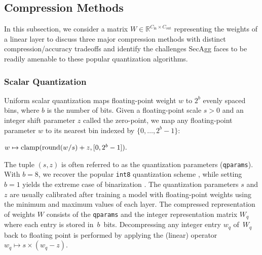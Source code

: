 \documentclass[11pt]{article}
\newcommand{\cin}{C_{\text{in}}}
\newcommand{\cout}{C_{\text{out}}}
\newcommand{\SecAgg}{{\sc SecAgg}\xspace}
\begin{document}

\subsection{Compression Methods}
\label{subsec:comp_methods}
In this subsection, we consider a matrix $W \in \mathbb{R}^{\cin\times \cout}$ representing the weights of a linear layer to discuss three major compression methods with distinct compression/accuracy tradeoffs and identify the challenges \SecAgg faces to be readily amenable to these popular quantization algorithms.

\subsubsection{Scalar Quantization}
\label{subsec:sq}

 Uniform scalar quantization maps floating-point weight $w$ to $2^b$ evenly spaced bins, where $b$ is the number of bits. Given a floating-point scale $s > 0$ and an integer shift parameter $z$ called the zero-point, we map any floating-point parameter $w$ to its nearest bin indexed by $\{0,\dots, 2^b-1\}$:

\centerline{$w \mapsto \operatorname{clamp}(\operatorname{round}(w /s) + z, [0, 2^b - 1] ).$}

%
The tuple $(s, z)$ is often referred to as the quantization parameters (\texttt{qparams}).
With $b=8$, we recover the popular \texttt{int8} quantization scheme \cite{Graham-jacob2017quantization}, while setting $b = 1$ yields the extreme case of binarization \cite{Graham-courbariaux2015binaryconnect}.
The quantization parameters $s$ and $z$ are usually calibrated after training a model with floating-point weights using the minimum and maximum values of each layer.
The compressed representation of weights $W$ consists of the \texttt{qparams} and the integer representation matrix $W_q$ where each entry is stored in~$b$~bits.
Decompressing any integer entry $w_q$ of~$W_q$ back to floating point is performed by applying  the (linear) operator $w_q \mapsto s\times(w_q - z)$.
\end{document}
